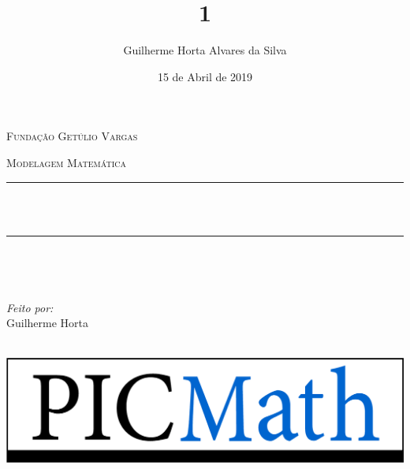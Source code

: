 \documentclass[12pt]{report}
\title{1}
\author{Guilherme Horta Alvares da Silva}
\date{15 de Abril de 2019}
\makeatletter
\let\thetitle\@title
\makeatother
\begin{document}

\begin{titlepage}
	\centering
    \vspace*{0.5 cm}
   \begin{center}    \textsc{\Large   Fundação Getúlio Vargas}\\[2.0 cm]	\end{center}%
   \textsc{\Large Modelagem Matemática  }\\[0.5 cm]				%
	\rule{\linewidth}{0.2 mm} \\[0.4 cm]
	{ \huge \bfseries \thetitle}\\
	\rule{\linewidth}{0.2 mm} \\[1.5 cm]
	
	\begin{minipage}{0.4\textwidth}
		\begin{flushleft} \large
			\end{flushleft}
			\end{minipage}~
			\begin{minipage}{0.4\textwidth}
            
			\begin{flushright} \large
        \emph{Feito por:} \\
      Guilherme Horta 
		\end{flushright}
           
	\end{minipage}\\[2 cm]
	
	\includegraphics[scale = 0.5]{PICMathLogo.png}
    
    
    
    
	
\end{titlepage}
\end{document}
